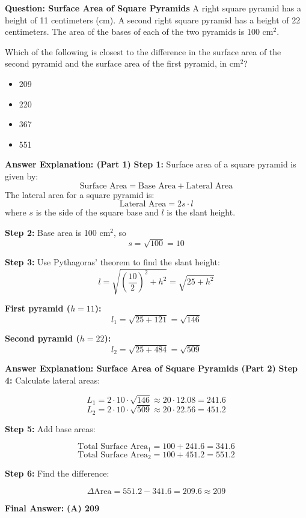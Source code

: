 \documentclass{beamer}
\begin{document}
\begin{frame}{\textbf{Question: Surface Area of Square Pyramids}}
A right square pyramid has a height of 11 centimeters (cm). A second right square pyramid has a height of 22 centimeters. The area of the bases of each of the two pyramids is 100 cm\(^2\).  
\vspace{0.3cm}

Which of the following is closest to the difference in the surface area of the second pyramid and the surface area of the first pyramid, in cm\(^2\)?

\begin{itemize}
    \item[(A)] 209
    \item[(B)] 220
    \item[(C)] 367
    \item[(D)] 551
\end{itemize}
\end{frame}

\begin{frame}{\textbf{Answer Explanation:  (Part 1)}}
\textbf{Step 1:} Surface area of a square pyramid is given by:  
\[
\text{Surface Area} = \text{Base Area} + \text{Lateral Area}
\]  
The lateral area for a square pyramid is:  
\[
\text{Lateral Area} = 2s \cdot l
\]  
where \(s\) is the side of the square base and \(l\) is the slant height.

\pause

\textbf{Step 2:} Base area is 100 cm\(^2\), so  
\[
s = \sqrt{100} = 10
\]

\textbf{Step 3:} Use Pythagoras’ theorem to find the slant height:
\[
l = \sqrt{\left(\frac{10}{2}\right)^2 + h^2} = \sqrt{25 + h^2}
\]

\textbf{First pyramid (\(h = 11\)):}  
\[
l_1 = \sqrt{25 + 121} = \sqrt{146}
\]

\textbf{Second pyramid (\(h = 22\)):}  
\[
l_2 = \sqrt{25 + 484} = \sqrt{509}
\]
\end{frame}

\begin{frame}{\textbf{Answer Explanation: Surface Area of Square Pyramids (Part 2)}}
\textbf{Step 4:} Calculate lateral areas:

\[
L_1 = 2 \cdot 10 \cdot \sqrt{146} \approx 20 \cdot 12.08 = 241.6
\]
\[
L_2 = 2 \cdot 10 \cdot \sqrt{509} \approx 20 \cdot 22.56 = 451.2
\]

\pause

\textbf{Step 5:} Add base areas:

\[
\text{Total Surface Area}_1 = 100 + 241.6 = 341.6
\]
\[
\text{Total Surface Area}_2 = 100 + 451.2 = 551.2
\]

\textbf{Step 6:} Find the difference:

\[
\Delta \text{Area} = 551.2 - 341.6 = 209.6 \approx \boxed{209}
\]

\textbf{Final Answer:} \textbf{(A) 209}
\end{frame}
\end{document}
